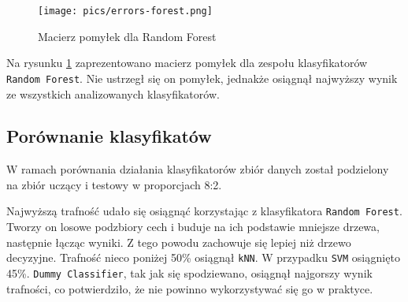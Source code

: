 \documentclass{article}
\begin{document}
\begin{figure}[!h]
\centering
    \texttt{[image: pics/errors-forest.png]}
    \caption{Macierz pomyłek dla Random Forest}
    \label{fig:errors-forest}
\end{figure}

Na rysunku \ref{fig:errors-forest} zaprezentowano macierz pomyłek dla zespołu klasyfikatorów \texttt{Random Forest}. Nie ustrzegł się on pomyłek, jednakże osiągnął najwyższy wynik ze wszystkich analizowanych klasyfikatorów.

\subsection{Porównanie klasyfikatów}
W ramach porównania działania klasyfikatorów zbiór danych został podzielony na zbiór uczący i testowy w proporcjach 8:2.

\begin{table}[h!]
\centering
\caption{Predykcja -- porównanie klasyfikatorów}
\label{tab:predykcja-porownanie-klasyfikatorow}
\end{table}

Najwyższą trafność udało się osiągnąć korzystając z klasyfikatora \texttt{Random Forest}. Tworzy on losowe podzbiory cech i buduje na ich podstawie mniejsze drzewa, następnie łącząc wyniki. Z tego powodu zachowuje się lepiej niż drzewo decyzyjne. Trafność nieco poniżej 50\% osiągnął \texttt{kNN}. W przypadku \texttt{SVM} osiągnięto 45\%. \texttt{Dummy Classifier}, tak jak się spodziewano, osiągnął najgorszy wynik trafności, co potwierdziło, że nie powinno wykorzystywać się go w praktyce.
\end{document}
